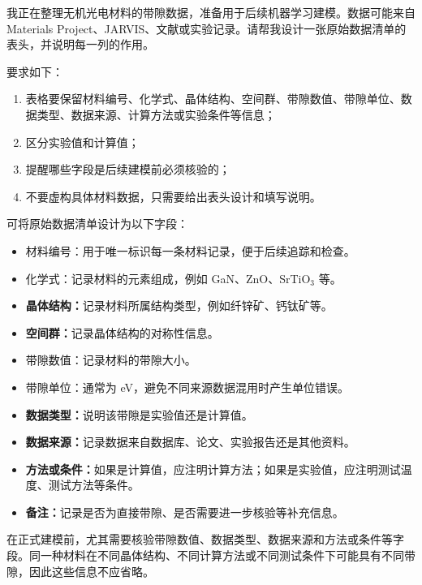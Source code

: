 \begin{samepage}
\begin{userbox}
我正在整理无机光电材料的带隙数据，准备用于后续机器学习建模。数据可能来自 Materials Project、JARVIS、文献或实验记录。请帮我设计一张原始数据清单的表头，并说明每一列的作用。

要求如下：
\begin{enumerate}
\item 表格要保留材料编号、化学式、晶体结构、空间群、带隙数值、带隙单位、数据类型、数据来源、计算方法或实验条件等信息；
\item 区分实验值和计算值；
\item 提醒哪些字段是后续建模前必须核验的；
\item 不要虚构具体材料数据，只需要给出表头设计和填写说明。
\end{enumerate}
\end{userbox}

\begin{aibox}
可将原始数据清单设计为以下字段：

\begin{itemize}
\item 材料编号：用于唯一标识每一条材料记录，便于后续追踪和检查。
\item 化学式：记录材料的元素组成，例如 GaN、ZnO、SrTiO$_3$ 等。
\item \textbf{晶体结构：}记录材料所属结构类型，例如纤锌矿、钙钛矿等。
\item \textbf{空间群：}记录晶体结构的对称性信息。
\item 带隙数值：记录材料的带隙大小。
\item 带隙单位：通常为 eV，避免不同来源数据混用时产生单位错误。
\item \textbf{数据类型：}说明该带隙是实验值还是计算值。
\item \textbf{数据来源：}记录数据来自数据库、论文、实验报告还是其他资料。
\item \textbf{方法或条件：}如果是计算值，应注明计算方法；如果是实验值，应注明测试温度、测试方法等条件。
\item \textbf{备注：}记录是否为直接带隙、是否需要进一步核验等补充信息。
\end{itemize}

在正式建模前，尤其需要核验带隙数值、数据类型、数据来源和方法或条件等字段。同一种材料在不同晶体结构、不同计算方法或不同测试条件下可能具有不同带隙，因此这些信息不应省略。
\end{aibox}
\end{samepage}


